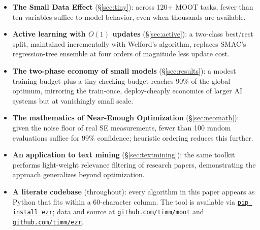 \documentclass[AMA,STIX2COL]{WileyNJDv5}
\begin{document}
\begin{itemize}
\item \textbf{The Small Data Effect} (\S\ref{sec:tiny}):
across 120+ MOOT tasks, fewer than ten variables suffice
to model behavior, even when thousands are available.
\item \textbf{Active learning with $O(1)$ updates}
(\S\ref{sec:active}): a two-class best/rest split,
maintained incrementally with Welford's algorithm, replaces
SMAC's regression-tree ensemble at four orders of magnitude
less update cost.
\item \textbf{The two-phase economy of small models}
(\S\ref{sec:results}): a modest training budget plus a tiny
checking budget reaches 90\% of the global optimum, mirroring
the train-once, deploy-cheaply economics of larger AI
systems but at vanishingly small scale.
\item \textbf{The mathematics of Near-Enough Optimization}
(\S\ref{sec:neomath}): given the noise floor of real SE
measurements, fewer than 100 random evaluations suffice for
99\% confidence; heuristic ordering reduces this further.
\item \textbf{An application to text mining}
(\S\ref{sec:textmining}): the same toolkit performs
light-weight relevance filtering of research papers,
demonstrating the approach generalizes beyond optimization.
\item \textbf{A literate codebase} (throughout): every
algorithm in this paper appears as Python that fits within a
60-character column. The tool is available via
\href{https://pypi.org/project/ezr/}{\texttt{pip install ezr}};
data and source at
\href{http://github.com/timm/moot}{\texttt{github.com/timm/moot}}
and
\href{http://github.com/timm/ezr}{\texttt{github.com/timm/ezr}}.
\end{itemize}

 



\end{document}
